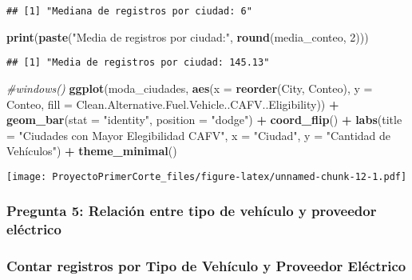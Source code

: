 \documentclass[
]{article}
\newenvironment{Shaded}{\begin{snugshade}}{\end{snugshade}}
\newcommand{\AttributeTok}[1]{\textcolor[rgb]{0.13,0.29,0.53}{#1}}
\newcommand{\CommentTok}[1]{\textcolor[rgb]{0.56,0.35,0.01}{\textit{#1}}}
\newcommand{\DecValTok}[1]{\textcolor[rgb]{0.00,0.00,0.81}{#1}}
\newcommand{\FunctionTok}[1]{\textcolor[rgb]{0.13,0.29,0.53}{\textbf{#1}}}
\newcommand{\NormalTok}[1]{#1}
\newcommand{\SpecialCharTok}[1]{\textcolor[rgb]{0.81,0.36,0.00}{\textbf{#1}}}
\newcommand{\StringTok}[1]{\textcolor[rgb]{0.31,0.60,0.02}{#1}}
\begin{document}
\begin{verbatim}
## [1] "Mediana de registros por ciudad: 6"
\end{verbatim}

\begin{Shaded}
\begin{Highlighting}[]
\FunctionTok{print}\NormalTok{(}\FunctionTok{paste}\NormalTok{(}\StringTok{"Media de registros por ciudad:"}\NormalTok{, }\FunctionTok{round}\NormalTok{(media\_conteo, }\DecValTok{2}\NormalTok{)))}
\end{Highlighting}
\end{Shaded}

\begin{verbatim}
## [1] "Media de registros por ciudad: 145.13"
\end{verbatim}

\begin{Shaded}
\begin{Highlighting}[]
\CommentTok{\#windows()}
\FunctionTok{ggplot}\NormalTok{(moda\_ciudades, }\FunctionTok{aes}\NormalTok{(}\AttributeTok{x =} \FunctionTok{reorder}\NormalTok{(City, Conteo), }\AttributeTok{y =}
\NormalTok{Conteo, }\AttributeTok{fill =}\NormalTok{ Clean.Alternative.Fuel.Vehicle..CAFV..Eligibility)) }\SpecialCharTok{+}
\FunctionTok{geom\_bar}\NormalTok{(}\AttributeTok{stat =} \StringTok{"identity"}\NormalTok{, }\AttributeTok{position =} \StringTok{"dodge"}\NormalTok{) }\SpecialCharTok{+} \FunctionTok{coord\_flip}\NormalTok{() }\SpecialCharTok{+}
\FunctionTok{labs}\NormalTok{(}\AttributeTok{title =} \StringTok{"Ciudades con Mayor Elegibilidad CAFV"}\NormalTok{, }\AttributeTok{x =} \StringTok{"Ciudad"}\NormalTok{, }\AttributeTok{y =}
\StringTok{"Cantidad de Vehículos"}\NormalTok{) }\SpecialCharTok{+} \FunctionTok{theme\_minimal}\NormalTok{()}
\end{Highlighting}
\end{Shaded}

\texttt{[image: ProyectoPrimerCorte\_files/figure-latex/unnamed-chunk-12-1.pdf]}

\subsubsection{Pregunta 5: Relación entre tipo de vehículo y proveedor
eléctrico}\label{pregunta-5-relaciuxf3n-entre-tipo-de-vehuxedculo-y-proveedor-eluxe9ctrico}

\subsubsection{Contar registros por Tipo de Vehículo y Proveedor
Eléctrico}\label{contar-registros-por-tipo-de-vehuxedculo-y-proveedor-eluxe9ctrico}
\end{document}
